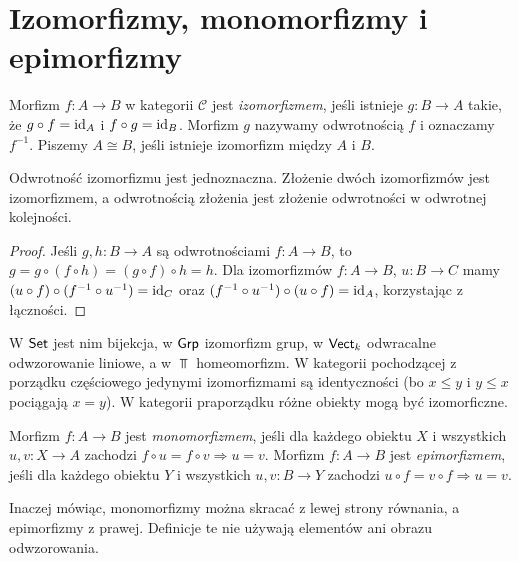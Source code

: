 \section{Izomorfizmy, monomorfizmy i epimorfizmy}\label{sec:morfizmy}

\begin{definicja}[Izomorfizm]
Morfizm $f:A\to B$ w kategorii $\mathcal C$ jest \emph{izomorfizmem}, jeśli istnieje $g:B\to A$ takie, że $g\circ f=\mathrm{id}_A$ i $f\circ g=\mathrm{id}_B$. Morfizm $g$ nazywamy odwrotnością $f$ i oznaczamy $f^{-1}$. Piszemy $A\cong B$, jeśli istnieje izomorfizm między $A$ i $B$.
\end{definicja}

\begin{stwierdzenie}
Odwrotność izomorfizmu jest jednoznaczna. Złożenie dwóch izomorfizmów jest izomorfizmem, a odwrotnością złożenia jest złożenie odwrotności w odwrotnej kolejności.
\end{stwierdzenie}
\begin{proof}
Jeśli $g,h:B\to A$ są odwrotnościami $f:A\to B$, to $g=g\circ(f\circ h)=(g\circ f)\circ h=h$. Dla izomorfizmów $f:A\to B$, $u:B\to C$ mamy $(u\circ f)\circ(f^{-1}\circ u^{-1})=\mathrm{id}_C$ oraz $(f^{-1}\circ u^{-1})\circ(u\circ f)=\mathrm{id}_A$, korzystając z łączności.
\end{proof}

\begin{przyklad}
W $\mathsf{Set}$ jest nim bijekcja, w $\mathsf{Grp}$ izomorfizm grup, w $\mathsf{Vect}_k$ odwracalne odwzorowanie liniowe, a w $\Top$ homeomorfizm. W kategorii pochodzącej z porządku częściowego jedynymi izomorfizmami są identyczności (bo $x\leq y$ i $y\leq x$ pociągają $x=y$). W kategorii praporządku różne obiekty mogą być izomorficzne.
\end{przyklad}

\begin{definicja}\label{def:mono-epi}
Morfizm $f:A\to B$ jest \emph{monomorfizmem}, jeśli dla każdego obiektu $X$ i wszystkich $u,v:X\to A$ zachodzi $f\circ u=f\circ v\Rightarrow u=v$. Morfizm $f:A\to B$ jest \emph{epimorfizmem}, jeśli dla każdego obiektu $Y$ i wszystkich $u,v:B\to Y$ zachodzi $u\circ f=v\circ f\Rightarrow u=v$.
\end{definicja}

Inaczej mówiąc, monomorfizmy można skracać z lewej strony równania, a epimorfizmy z prawej. Definicje te nie używają elementów ani obrazu odwzorowania.

